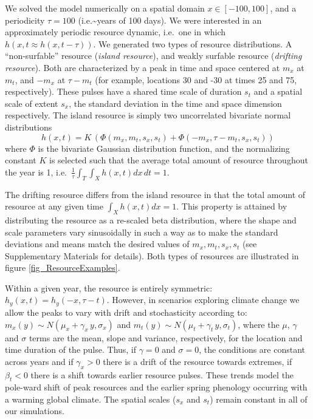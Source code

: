 \documentclass[utf8]{frontiersSCNS} %
\begin{document}
We solved the model numerically on a spatial domain $x \in [-100,100]$, and a periodicity $\tau = 100$ (i.e.\textasciitilde years of 100 days). We were interested in an approximately periodic resource dynamic, i.e.~one in which $h(x,t \approx h(x, t-\tau))$. We generated two types of resource distributions. A ``non-surfable'' resource (\emph{island resource}), and weakly surfable resource (\emph{drifting resource}). Both are characterized by a peak in time and space centered at $m_x$ at $m_t$, and $-m_x$ at $\tau - m_t$ (for example, locations 30 and -30 at times 25 and 75, respectively). These pulses have a shared time scale of duration $s_t$ and a spatial scale of extent $s_x$, the standard deviation in the time and space dimension respectively. The island resource is simply two uncorrelated bivariate normal
distributions 
$$h(x,t) = K\,(\Phi(m_x, m_t, s_x, s_t) + \Phi(-m_x, \tau - m_t, s_x, s_t))$$ 
\noindent where $\Phi$ is the bivariate Gaussian distribution function, and the normalizing constant $K$ is selected such that the average total amount of resource throughout the year is 1, i.e.~$\frac{1}{\tau} \int_T\int_X h(x,t) dx\,dt = 1$.

The drifting resource differs from the island resource in that the total amount of resource at any given time $\int_X h(x,t) dx = 1$. This property is attained by distributing the resource as a re-scaled beta distribution, where the shape and scale parameters vary sinusoidally in such a way as to make the standard deviations and means match the desired values of $m_x, m_t, s_x, s_t$ (see Supplementary Materials for details). Both types of resources are illustrated in figure \ref{fig_ResourceExamples}.

Within a given year, the resource is entirely symmetric: $h_y(x,t) = h_y(-x, \tau-t)$. However, in scenarios exploring climate change we allow the peaks to vary with drift and stochasticity according to: $m_x(y) \sim {N}(\mu_x + \gamma_x\,y, \sigma_x)$ and $m_t(y) \sim {N}(\mu_t + \gamma_t\,y, \sigma_t)$, where the $\mu$, $\gamma$ and $\sigma$ terms are the mean, slope and variance, respectively, for the location and time duration of the pulse. Thus, if $\gamma=0$ and $\sigma=0$, the conditions are constant across years and if $\gamma_x > 0$ there is a drift of the resource towards extremes, if $\beta_t < 0$ there is a shift towards earlier resource pulses. These trends model the pole-ward shift of peak resources and the earlier spring phenology occurring with a warming global climate. The spatial scales ($s_x$ and $s_t$) remain constant in all of our simulations. 
\end{document}
